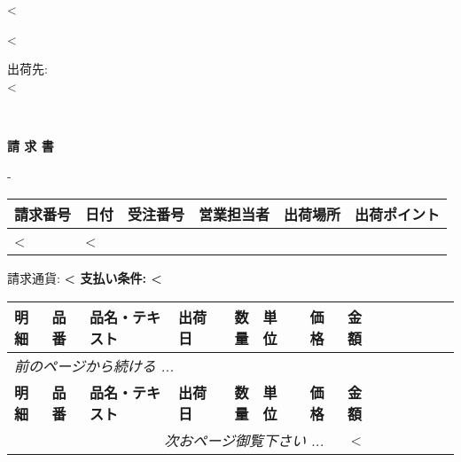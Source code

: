 <%

\begin{CJK}{UTF8}{arialuni}

\vspace*{-3.3cm}
<%
\vspace*{0.5cm}

\parbox[t]{.80\textwidth}{
出荷先: \\
<%
}

\hfill \\

\vspace{1.2cm}
 
\centerline{\large\bf{請 求 書}}
\normalsize

\vspace{0.5cm}
-
\vspace{0.2cm}

\begin{tabularx}{\textwidth}{*{6}{|X}|} \hline
  \textbf{請求番号} & \textbf{日付} & \textbf{受注番号}
  & \textbf{営業担当者} & \textbf{出荷場所} &
  \textbf{出荷ポイント} \\ [0.5em]
  \hline
  <%
  & <%
  \hline
\end{tabularx}

\parbox{\textwidth}{
\vspace{0.5cm}
	請求通貨:   \textbf{<%
	支払い条件: <%
}

\vspace{0.5cm}

\begin{longtable}{|ll p{5.5cm} @{\extracolsep\fill} lrlrr|} \hline
\xstrut
  \textbf{明細} & \textbf{品番} & \textbf{品名・テキスト} & \textbf{出荷日} &
	\textbf{数量} & \textbf{単位}  & \textbf{価格} & \textbf{金額} \\     
  \hline
\endfirsthead
  \multicolumn{7}{l}{\emph{前のページから続ける ...}} \\
  \hline
  \textbf{明細} & \textbf{品番} & \textbf{品名・テキスト} & \textbf{出荷日} & 
	\textbf{数量} & \textbf{単位} & \textbf{価格} & \textbf{金額} \\ 
  \hline
\endhead
   \hline \multicolumn{7}{r}{\emph{次おページ御覧下さい ...}}
\endfoot
   \hline
   \multicolumn{7}{|r} \textbf{合計} & <%


\end{longtable}}
\end{CJK}
